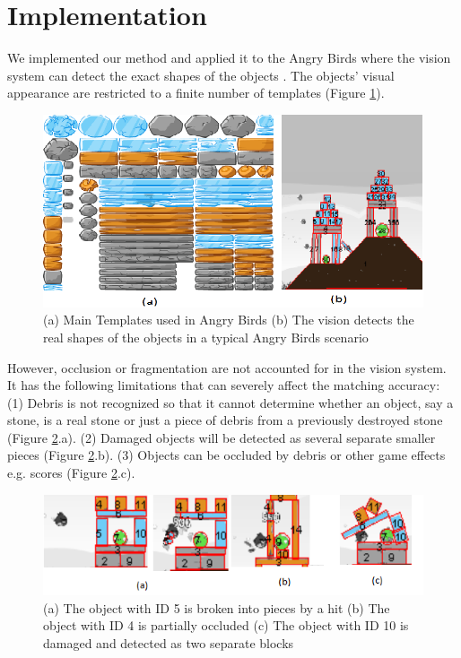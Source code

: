 \documentclass[letterpaper]{article}
\begin{document}
\section{Implementation}

We implemented our method and applied it to the Angry Birds where the vision system can detect the exact shapes of the objects \cite{andrewwang}. The objects' visual appearance are restricted to a finite number of templates (Figure \ref{Templates}).  
\begin{figure}[t!]
\centering\includegraphics[scale=0.28]{Templates2.png}
\vspace{-2.5mm}
\caption{(a) Main Templates used in Angry Birds (b) The vision detects the real shapes of the objects in a typical Angry Birds scenario}
\label{Templates}
\vspace{-4mm}
\end{figure}
However, occlusion or fragmentation are not accounted for in the vision system.
It has the following limitations that can severely affect the matching accuracy: (1) Debris is not recognized so that it cannot determine whether an object, say a stone, is a real stone or just a piece of debris from a previously destroyed stone (Figure \ref{Fragments}.a). (2) Damaged objects will be detected as several separate smaller pieces (Figure \ref{Fragments}.b). (3) Objects can be occluded by debris or other game effects e.g. scores (Figure \ref{Fragments}.c).
\begin{figure}[t!]
\centering\includegraphics[scale=0.6]{Fragmentation2.png}
\vspace{-7mm}\caption{(a) The object with ID 5 is broken into pieces by a hit (b) The object with ID 4 is partially occluded (c) The object with ID 10 is damaged and detected as two separate blocks}
\label{Fragments}
\vspace{-5mm}
\end{figure}
\end{document}
